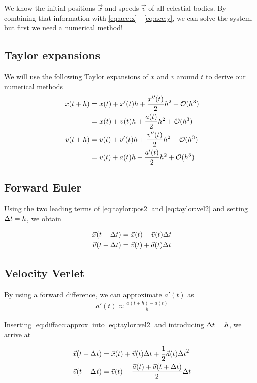 \documentclass[a4paper]{article}
\begin{document}
We know the initial positions $\vec{x}$ and speeds $\vec{v}$ of all celestial bodies. By combining that information with \eqref{eq:acc:x} - \eqref{eq:acc:y}, we can solve the system, but first we need a numerical method!




\subsection{Taylor expansions}
We will use the following Taylor expansions of $x$ and $v$ around $t$ to derive our numerical methods
\begin{align}
    x(t + h) &= x(t) + x'(t) h + \frac{x''(t)}{2} h^2 + {\mathcal{O}}(h^3) \label{eq:taylor:pos1}\\
    &= x(t) + v(t) h + \frac{a(t)}{2} h^2 + {\mathcal{O}}(h^3) \label{eq:taylor:pos2} \\
    v(t + h) &= v(t) + v'(t) h + \frac{v''(t)}{2} h^2 + {\mathcal{O}}(h^3) \label{eq:taylor:vel1} \\
    &= v(t) + a(t) h + \frac{a'(t)}{2} h^2 + {\mathcal{O}}(h^3) \label{eq:taylor:vel2}
\end{align}

\subsection{Forward Euler}
Using the two leading terms of \eqref{eq:taylor:pos2} and \eqref{eq:taylor:vel2} and setting ${\Delta t} = h$, we obtain

\begin{align}
    \vec{x}(t + {\Delta t}) &= \vec{x}(t) + \vec{v}(t){\Delta t}  \label{eq:forwardeuler:pos} \\
    \vec{v}(t + {\Delta t}) &= \vec{v}(t) + \vec{a}(t){\Delta t} \label{eq:forwardeuler:vel}
\end{align}

\subsection{Velocity Verlet}

By using a forward difference, we can approximate $a'(t)$ as
\begin{align}
    a'(t) \approx \frac{a(t+h) - a(t)}{h} \label{eq:diffacc:approx}
\end{align}

Inserting \eqref{eq:diffacc:approx} into \eqref{eq:taylor:vel2} and introducing ${\Delta t} = h$, we arrive at

\begin{align}
\vec{x}(t + {\Delta t}) &= \vec{x}(t) + \vec{v}(t){\Delta t} + \frac{1}{2} \vec{a}(t) {\Delta t}^2 \label{eq:velverlet:pos} \\
\vec{v}(t + {\Delta t}) &= \vec{v}(t) + \frac{\vec{a}(t) + \vec{a}(t + {\Delta t})}{2} {\Delta t} \label{eq:velverlet:vel}
\end{align}
\end{document}
